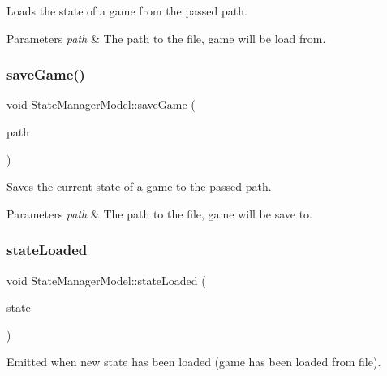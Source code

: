 Loads the state of a game from the passed path. 


\begin{DoxyParams}{Parameters}
{\em path} & The path to the file, game will be load from. \\
\hline
\end{DoxyParams}
\mbox{\label{class_state_manager_model_a57883b92890873f23537e78c1bf6f2de}} 
\subsubsection{\texorpdfstring{saveGame()}{saveGame()}}
{\footnotesize\ttfamily void State\+Manager\+Model\+::save\+Game (\begin{DoxyParamCaption}\item[{const Q\+String \&}]{path }\end{DoxyParamCaption})}



Saves the current state of a game to the passed path. 


\begin{DoxyParams}{Parameters}
{\em path} & The path to the file, game will be save to. \\
\hline
\end{DoxyParams}
\mbox{\label{class_state_manager_model_ade47748f618f84b0a2a32be1da177ad5}} 
\subsubsection{\texorpdfstring{stateLoaded}{stateLoaded}}
{\footnotesize\ttfamily void State\+Manager\+Model\+::state\+Loaded (\begin{DoxyParamCaption}\item[{const \mbox{\hyperlink{struct_load_state}{Load\+State}} \&}]{state }\end{DoxyParamCaption})\hspace{0.3cm}{\ttfamily [signal]}}



Emitted when new state has been loaded (game has been loaded from file). 


